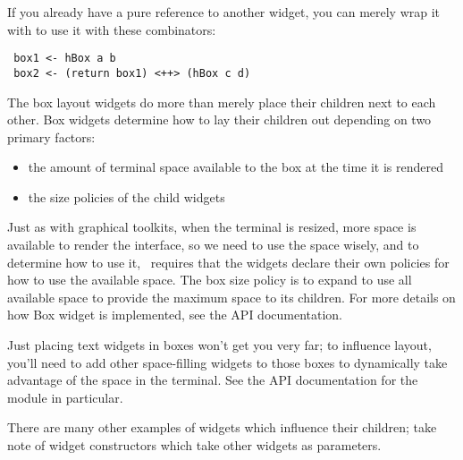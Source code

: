 If you already have a pure reference to another widget, you can merely
wrap it with  to use it with these combinators:

\begin{verbatim}
 box1 <- hBox a b
 box2 <- (return box1) <++> (hBox c d)
\end{verbatim}

The box layout widgets do more than merely place their children next to
each other.  Box widgets determine how to lay their children out
depending on two primary factors:

\begin{itemize}
\item the amount of terminal space available to the box at the time it
      is rendered
\item the size policies of the child widgets
\end{itemize}

Just as with graphical toolkits, when the terminal is resized, more
space is available to render the interface, so we need to use the
space wisely, and to determine how to use it, \vtyui\ requires that
the widgets declare their own policies for how to use the available
space.  The box size policy is to expand to use all available space to
provide the maximum space to its children.  For more details on how
Box widget is implemented, see the API documentation.

Just placing text widgets in boxes won't get you very far; to
influence layout, you'll need to add other space-filling widgets to
those boxes to dynamically take advantage of the space in the
terminal.  See the API documentation for the  module in
particular.

There are many other examples of widgets which influence their children;
take note of widget constructors which take other widgets as parameters.
